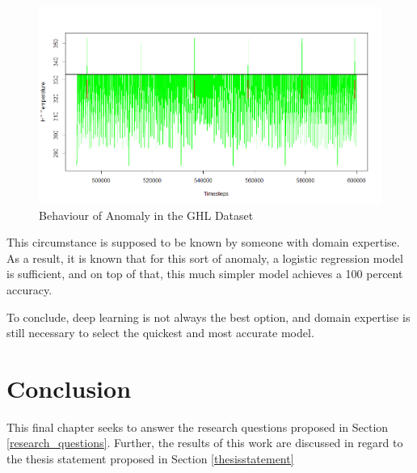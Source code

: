 \begin{figure}[h]
	\centering
	\includegraphics[scale=0.45]{Figures/review}
	\decoRule
	\caption[Behaviour of Anomaly in the GHL Dataset]{Behaviour of Anomaly in the GHL Dataset \parencite{own}}
	\label{fig:review}
\end{figure}

This circumstance is supposed to be known by someone with domain expertise.
As a result, it is known that for this sort of anomaly, a logistic regression model is sufficient, and on top of that, this much simpler model achieves a 100 percent accuracy. 

To conclude, deep learning is not always the best option, and domain expertise is still necessary to select the quickest and most accurate model.   






\chapter{Conclusion}

This final chapter seeks to answer the research questions proposed in Section \ref{research_questions}. Further, the results of this work are discussed in regard to the thesis statement proposed in Section \ref{thesisstatement}

